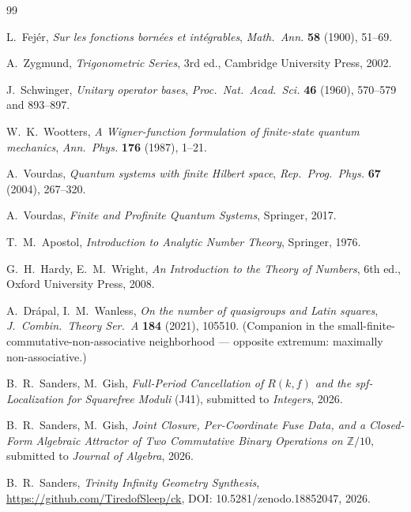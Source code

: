 \documentclass[11pt,reqno]{amsart}
\theoremstyle{plain}
\theoremstyle{definition}
\theoremstyle{remark}
\newcommand{\Z}{\mathbb{Z}}
\begin{document}
\begin{thebibliography}{99}

L.~Fej\'er,
\emph{Sur les fonctions born\'ees et int\'egrables},
\textit{Math.\ Ann.} \textbf{58} (1900), 51--69.

A.~Zygmund,
\emph{Trigonometric Series}, 3rd ed.,
Cambridge University Press, 2002.

J.~Schwinger,
\emph{Unitary operator bases},
\textit{Proc.\ Nat.\ Acad.\ Sci.} \textbf{46} (1960), 570--579 and 893--897.

W.~K.~Wootters,
\emph{A Wigner-function formulation of finite-state quantum mechanics},
\textit{Ann.\ Phys.} \textbf{176} (1987), 1--21.

A.~Vourdas,
\emph{Quantum systems with finite Hilbert space},
\textit{Rep.\ Prog.\ Phys.} \textbf{67} (2004), 267--320.

A.~Vourdas,
\emph{Finite and Profinite Quantum Systems},
Springer, 2017.

T.~M.~Apostol,
\emph{Introduction to Analytic Number Theory},
Springer, 1976.

G.~H.~Hardy, E.~M.~Wright,
\emph{An Introduction to the Theory of Numbers}, 6th ed.,
Oxford University Press, 2008.

A.~Dr\'apal, I.~M.~Wanless,
\emph{On the number of quasigroups and Latin squares},
\textit{J.\ Combin.\ Theory Ser.\ A} \textbf{184} (2021), 105510.
(Companion in the small-finite-commutative-non-associative neighborhood --- opposite
extremum: maximally non-associative.)

B.~R.~Sanders, M.~Gish,
\emph{Full-Period Cancellation of $R(k,f)$ and the spf-Localization for Squarefree
Moduli} (J41),
submitted to \textit{Integers}, 2026.

B.~R.~Sanders, M.~Gish,
\emph{Joint Closure, Per-Coordinate Fuse Data, and a Closed-Form Algebraic Attractor of
Two Commutative Binary Operations on $\Z/10$},
submitted to \textit{Journal of Algebra}, 2026.

B.~R.~Sanders,
\emph{Trinity Infinity Geometry Synthesis},
\url{https://github.com/TiredofSleep/ck},
DOI: 10.5281/zenodo.18852047, 2026.

\end{thebibliography}
\end{document}
